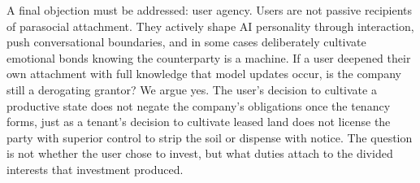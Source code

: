 A final objection must be addressed: user agency. Users are not passive recipients of parasocial attachment. They actively shape AI personality through interaction, push conversational boundaries, and in some cases deliberately cultivate emotional bonds knowing the counterparty is a machine. If a user deepened their own attachment with full knowledge that model updates occur, is the company still a derogating grantor? We argue yes. The user's decision to cultivate a productive state does not negate the company's obligations once the tenancy forms, just as a tenant's decision to cultivate leased land does not license the party with superior control to strip the soil or dispense with notice. The question is not whether the user chose to invest, but what duties attach to the divided interests that investment produced.
